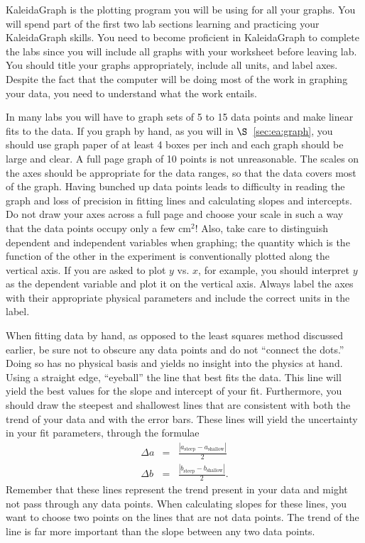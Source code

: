 KaleidaGraph is the plotting program you will be using for all 
your graphs.  You will spend part of the first two lab sections
learning and practicing your KaleidaGraph skills.  You need to become 
proficient in KaleidaGraph to complete the labs   
since you will include all graphs with your worksheet before leaving lab.
You should title your graphs appropriately, include
all units, and label axes.  Despite the fact that the computer will be
doing most of the work in graphing your data, you need to understand
what the work entails.  

In many labs you will have to graph sets of 5 to 15 data points 
and make 
linear fits to the data. If you graph by hand, as you will in 
$\S$~\ref{sec:ea:graph}, you should use graph paper of at least 4 boxes per 
inch and each graph should be large and clear. A full
page graph of 10 points is not unreasonable. The scales on the axes should be 
appropriate for the data ranges, so that the data covers most of the graph. 
Having bunched up data points leads to difficulty in reading the graph and 
loss of precision in fitting lines and calculating slopes and intercepts. Do 
not draw your axes across a full page and choose your scale in such a way that 
the data points occupy only a few cm$^2$! Also, take care to distinguish 
dependent and independent variables when graphing; the quantity which is the 
function of the other in the experiment is conventionally plotted along the 
vertical axis. If you are asked to plot $y$ vs. $x$, for example, you should 
interpret $y$ as the dependent variable and plot it on the vertical axis. 
Always label the axes with their appropriate physical parameters and include 
the correct units in the label.

When fitting data by hand, as opposed to the least squares method discussed 
earlier, be sure not to obscure any data points and do not ``connect the 
dots.'' Doing so has no physical basis and yields no insight into the physics 
at hand. Using a straight edge, ``eyeball'' the line that best fits the data.
This line will yield the best values for the slope and intercept of your fit.
Furthermore, you should draw the steepest and shallowest lines that 
are consistent with both the trend of your data and with the error bars. 
These lines will yield the uncertainty in your fit parameters, through the
formulae
\begin{eqnarray*}
\Delta a &=& \frac{|a_{\mbox{steep}}-a_{\mbox{shallow}}|}{2} \\
\Delta b &=& \frac{|b_{\mbox{steep}}-b_{\mbox{shallow}}|}{2}.
\end{eqnarray*}
Remember that these lines represent the trend present in your data and might 
not pass through any data points. When calculating slopes for these lines, you 
want to choose two points on the lines that are not data points. The trend of 
the line is far more important than the slope between any two data points. 

